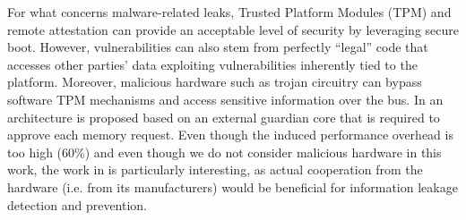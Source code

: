 \documentclass[11pt,onecolumn,letterpaper]{IEEEtran}
\begin{document}
For what concerns malware-related leaks, Trusted Platform Modules (TPM) \cite{tifstpm, tifstpm2} and remote attestation can provide an acceptable
level of security by leveraging secure boot.
However, vulnerabilities can also stem from perfectly ``legal'' code 
that accesses other parties' data exploiting vulnerabilities inherently tied to the platform.
Moreover, malicious hardware such as trojan circuitry can bypass software TPM mechanisms and access 
sensitive information over the bus. 
In \cite{Das:2010:DIL:1870926.1871135} an architecture is proposed  based on an external guardian 
core that is required to approve each memory request. 
Even though the induced performance overhead is too high (60\%) and even though we do not consider
malicious hardware in this work, the work in \cite{Das:2010:DIL:1870926.1871135} is particularly interesting, 
as actual cooperation from the hardware (i.e. from its manufacturers) would be beneficial for information leakage detection and prevention.
\end{document}
